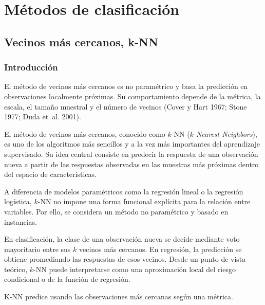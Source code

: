 \documentclass[
  spanish,
  10.5pt,
  letterpaper,
  DIV=11,
  numbers=noendperiod,
  oneside,
  open=any]{scrreprt}
\theoremstyle{definition}
\theoremstyle{definition}
\theoremstyle{plain}
\theoremstyle{remark}
\begin{document}
\part{Métodos de clasificación}

\chapter{\texorpdfstring{Vecinos más cercanos,
k-NN}{Vecinos más cercanos, k-NN}}\label{sec-knn}

\section*{Introducción}\label{introducciuxf3n-12}


El método de vecinos más cercanos es no paramétrico y basa la predicción
en observaciones localmente próximas. Su comportamiento depende de la
métrica, la escala, el tamaño muestral y el número de vecinos (Cover y
Hart 1967; Stone 1977; Duda et~al. 2001).

El método de vecinos más cercanos, conocido como \(k\)-NN
(\emph{\(k\)-Nearest Neighbors}), es uno de los algoritmos más sencillos
y a la vez más importantes del aprendizaje supervisado. Su idea central
consiste en predecir la respuesta de una observación nueva a partir de
las respuestas observadas en las muestras más próximas dentro del
espacio de características.

A diferencia de modelos paramétricos como la regresión lineal o la
regresión logística, \(k\)-NN no impone una forma funcional explícita
para la relación entre variables. Por ello, se considera un método no
paramétrico y basado en instancias.

En clasificación, la clase de una observación nueva se decide mediante
voto mayoritario entre sus \(k\) vecinos más cercanos. En regresión, la
predicción se obtiene promediando las respuestas de esos vecinos. Desde
un punto de vista teórico, \(k\)-NN puede interpretarse como una
aproximación local del riesgo condicional o de la función de regresión.

\begin{tcolorbox}[enhanced jigsaw, arc=.35mm, bottomrule=.15mm, bottomtitle=1mm, breakable, colback=white, colbacktitle=quarto-callout-important-color!10!white, colframe=quarto-callout-important-color-frame, coltitle=black, left=2mm, leftrule=.75mm, opacityback=0, opacitybacktitle=0.6, rightrule=.15mm, title=\textcolor{quarto-callout-important-color}{\faExclamation}\hspace{0.5em}{Definición esencial}, titlerule=0mm, toprule=.15mm, toptitle=1mm]

K-NN predice usando las observaciones más cercanas según una métrica.

\end{tcolorbox}
\end{document}
